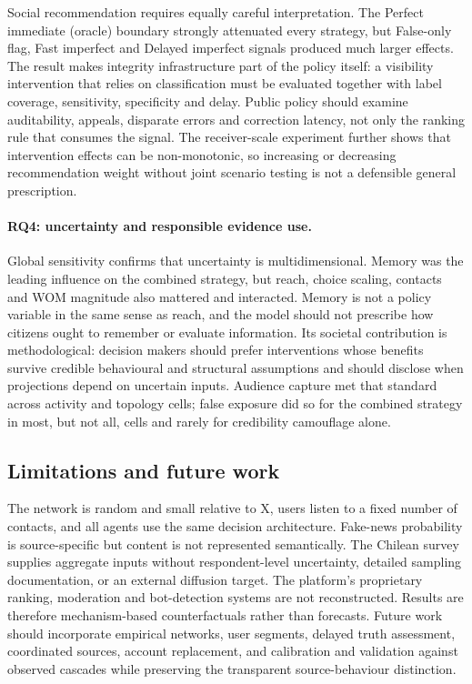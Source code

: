 Social recommendation requires equally careful interpretation. The Perfect immediate (oracle) boundary strongly attenuated every strategy, but False-only flag, Fast imperfect and Delayed imperfect signals produced much larger effects. The result makes integrity infrastructure part of the policy itself: a visibility intervention that relies on classification must be evaluated together with label coverage, sensitivity, specificity and delay. Public policy should examine auditability, appeals, disparate errors and correction latency, not only the ranking rule that consumes the signal. The receiver-scale experiment further shows that intervention effects can be non-monotonic, so increasing or decreasing recommendation weight without joint scenario testing is not a defensible general prescription.

\paragraph{RQ4: uncertainty and responsible evidence use.} Global sensitivity confirms that uncertainty is multidimensional. Memory was the leading influence on the combined strategy, but reach, choice scaling, contacts and WOM magnitude also mattered and interacted. Memory is not a policy variable in the same sense as reach, and the model should not prescribe how citizens ought to remember or evaluate information. Its societal contribution is methodological: decision makers should prefer interventions whose benefits survive credible behavioural and structural assumptions and should disclose when projections depend on uncertain inputs. Audience capture met that standard across activity and topology cells; false exposure did so for the combined strategy in most, but not all, cells and rarely for credibility camouflage alone.

\subsection{Limitations and future work}

The network is random and small relative to X, users listen to a fixed number of contacts, and all agents use the same decision architecture. Fake-news probability is source-specific but content is not represented semantically. The Chilean survey supplies aggregate inputs without respondent-level uncertainty, detailed sampling documentation, or an external diffusion target. The platform's proprietary ranking, moderation and bot-detection systems are not reconstructed. Results are therefore mechanism-based counterfactuals rather than forecasts. Future work should incorporate empirical networks, user segments, delayed truth assessment, coordinated sources, account replacement, and calibration and validation against observed cascades while preserving the transparent source-behaviour distinction.
